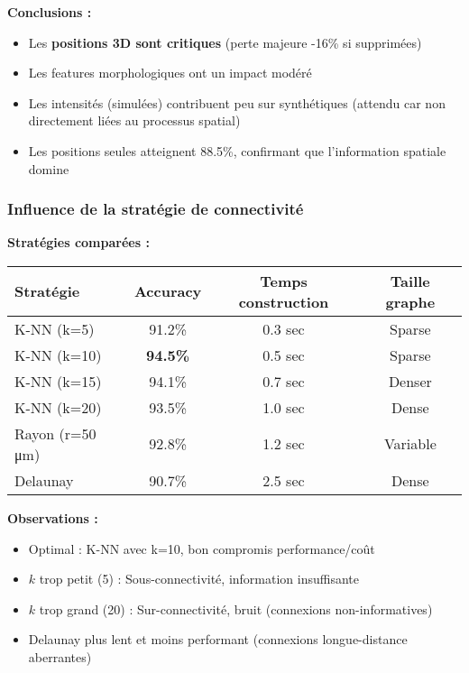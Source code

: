 \textbf{Conclusions :}
\begin{itemize}
    \item Les \textbf{positions 3D sont critiques} (perte majeure -16\% si supprimées)
    \item Les features morphologiques ont un impact modéré
    \item Les intensités (simulées) contribuent peu sur synthétiques (attendu car non directement liées au processus spatial)
    \item Les positions seules atteignent 88.5\%, confirmant que l'information spatiale domine
\end{itemize}

\subsubsection{Influence de la stratégie de connectivité}

\textbf{Stratégies comparées :}

\begin{center}
\begin{tabular}{|l|c|c|c|}
\hline
\textbf{Stratégie} & \textbf{Accuracy} & \textbf{Temps construction} & \textbf{Taille graphe} \\
\hline
K-NN (k=5) & 91.2\% & 0.3 sec & Sparse \\
K-NN (k=10) & \textbf{94.5\%} & 0.5 sec & Sparse \\
K-NN (k=15) & 94.1\% & 0.7 sec & Denser \\
K-NN (k=20) & 93.5\% & 1.0 sec & Dense \\
Rayon (r=50 μm) & 92.8\% & 1.2 sec & Variable \\
Delaunay & 90.7\% & 2.5 sec & Dense \\
\hline
\end{tabular}
\end{center}

\textbf{Observations :}
\begin{itemize}
    \item Optimal : K-NN avec k=10, bon compromis performance/coût
    \item $k$ trop petit (5) : Sous-connectivité, information insuffisante
    \item $k$ trop grand (20) : Sur-connectivité, bruit (connexions non-informatives)
    \item Delaunay plus lent et moins performant (connexions longue-distance aberrantes)
\end{itemize}

